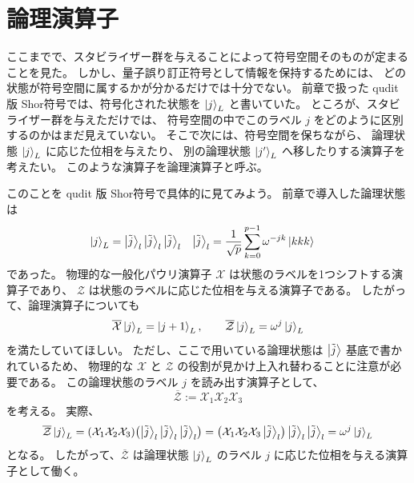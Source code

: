 \documentclass[../master.tex]{subfiles}
\begin{document}
\section{論理演算子}
ここまでで、スタビライザー群を与えることによって符号空間そのものが定まることを見た。
しかし、量子誤り訂正符号として情報を保持するためには、
どの状態が符号空間に属するかが分かるだけでは十分でない。
前章で扱った qudit 版 Shor符号では、符号化された状態を $\ket{j}_L$ と書いていた。
ところが、スタビライザー群を与えただけでは、
符号空間の中でこのラベル $j$ をどのように区別するのかはまだ見えていない。
そこで次には、符号空間を保ちながら、
論理状態 $\ket{j}_L$ に応じた位相を与えたり、
別の論理状態 $\ket{j'}_L$ へ移したりする演算子を考えたい。
このような演算子を論理演算子と呼ぶ。

このことを qudit 版 Shor符号で具体的に見てみよう。
前章で導入した論理状態は
\begin{equation}\begin{aligned}[b]
    \ket{j}_L &= \ket{\tilde{j}}_l \ket{\tilde{j}}_l \ket{\tilde{j}}_l &
    \ket{\tilde{j}}_l &= \frac{1}{\sqrt{p}}\sum_{k=0}^{p-1}\omega^{-jk}\ket{kkk}
\end{aligned}\end{equation}
であった。
物理的な一般化パウリ演算子 $\mathcal{X}$ は状態のラベルを1つシフトする演算子であり、
$\mathcal{Z}$ は状態のラベルに応じた位相を与える演算子である。
したがって、論理演算子についても
\begin{equation}
    \overline{\mathcal{X}}\ket{j}_L=\ket{j+1}_L,\qquad
    \overline{\mathcal{Z}}\ket{j}_L=\omega^j\ket{j}_L
\end{equation}
を満たしていてほしい。
ただし、ここで用いている論理状態は $\ket{\tilde{j}}$ 基底で書かれているため、
物理的な $\mathcal{X}$ と $\mathcal{Z}$ の役割が見かけ上入れ替わることに注意が必要である。
この論理状態のラベル $j$ を読み出す演算子として、
\begin{equation}
    \overline{\mathcal{Z}} := \mathcal{X}_1\mathcal{X}_2\mathcal{X}_3
\end{equation}
を考える。
実際、
\begin{equation}\begin{aligned}[b]
    \overline{\mathcal{Z}}\ket{j}_L
    = (\mathcal{X}_1\mathcal{X}_2\mathcal{X}_3)
    \qty(\ket{\tilde{j}}_l \ket{\tilde{j}}_l \ket{\tilde{j}}_l)
    = \qty(\mathcal{X}_1\mathcal{X}_2\mathcal{X}_3\ket{\tilde{j}}_l)
    \ket{\tilde{j}}_l \ket{\tilde{j}}_l
    = \omega^{j}\ket{j}_L
\end{aligned}\end{equation}
となる。
したがって、$\overline{\mathcal{Z}}$ は論理状態 $\ket{j}_L$ のラベル $j$ に応じた位相を与える演算子として働く。
\end{document}
